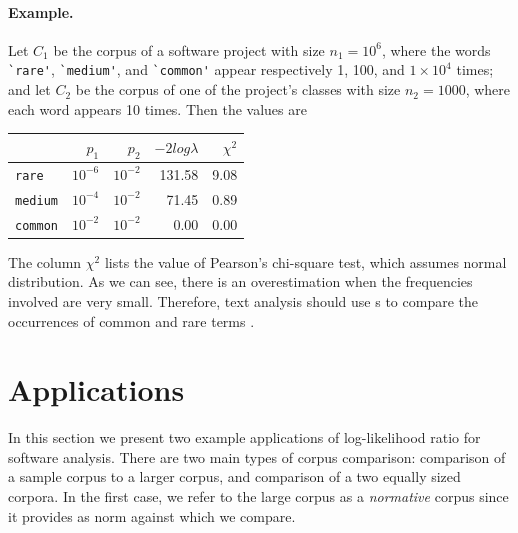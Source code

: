 \paragraph{Example.} Let $C_1$ be the corpus of a software project with size $n_1 = 10^6$, where the words \verb$`rare'$, \verb$`medium'$, and \verb$`common'$ appear respectively 1, 100, and $1\times10^4$ times; and let $C_2$ be the corpus of one of the project's classes with size $n_2 = 1000$, where each word appears 10 times. Then the \loglr{} values are

\begin{center}
\begin{tabular}{l | rrrr}
~ & $p_1$ & $p_2$ & $-2log\lambda$ & $\chi^2$ \\ 
\hline
\verb$rare$ & $10^{-6}$ & $10^{-2}$  & 131.58 & 9.08 \\
\verb$medium$ & $10^{-4}$ & $10^{-2}$  & 71.45 & 0.89 \\
\verb$common$ & $10^{-2}$ & $10^{-2}$  & 0.00 & 0.00 \\
\end{tabular}
\end{center}

The column $\chi^2$ lists the value of Pearson's chi-square test, which assumes normal distribution. As we can see, there is an overestimation when the frequencies involved are very small. Therefore, text analysis should use \loglr{}s to compare the occurrences of common and rare terms \cite{Dunning}.


\section{Applications}\label{applications}

In this section we present two example applications of log-likelihood ratio for software analysis.
There are two main types of corpus comparison: comparison of a sample corpus to a larger corpus, and comparison of a two equally sized corpora. In the first case, we refer to the large corpus as a \emph{normative} corpus since it provides as norm against which we compare.

